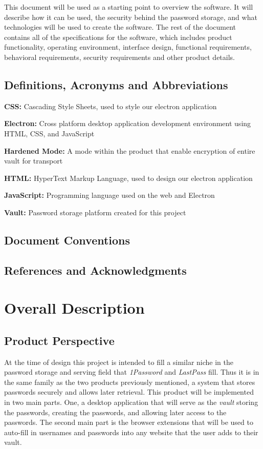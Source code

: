 \documentclass[12pt]{report}
\begin{document}
This document will be used as a starting point to overview the
software. It will describe how it can be used, the security behind the
password storage, and what technologies will be used to create the software.
The rest of the document contains all of the specifications for the
software, which includes product functionality, operating environment,
interface design, functional requirements, behavioral requirements, 
security requirements and other product details.
\section{Definitions, Acronyms and Abbreviations}
\textbf{CSS:} Cascading Style Sheets, used to style our electron application

\textbf{Electron:} Cross platform desktop application development environment
using HTML, CSS, and JavaScript

\textbf{Hardened Mode:} A mode within the product that enable encryption of entire
vault for transport

\textbf{HTML:} HyperText Markup Language, used to design our electron application

\textbf{JavaScript:} Programming language used on the web and Electron

\textbf{Vault:} Password storage platform created for this project

\section{Document Conventions}

\section{References and Acknowledgments}


\chapter{Overall Description}

\section{Product Perspective}
At the time of design this project is intended to fill a similar
niche in the password storage and serving field that \textit{1Password}
and \textit{LastPass} fill. Thus it is in the same family as
the two products previously mentioned, a system that stores passwords
securely and allows later retrieval. This product will be implemented in
two main parts. One, a desktop application that will serve as the \textit{vault}
storing the passwords, creating the passwords, and allowing later access
to the passwords. The second main part is the browser extensions that
will be used to auto-fill in usernames and passwords into any website
that the user adds to their vault. 
\end{document}
